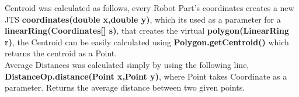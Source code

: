  Centroid was calculated as follows, every Robot Part's coordinates creates a new JTS \textbf{coordinates(double x,double y)}, which its used as a parameter for a \textbf{linearRing(Coordinates[] s)}, that creates the virtual \textbf{polygon(LinearRing r)}, the Centroid can be easily calculated using \textbf{Polygon.getCentroid()} which returns the centroid as a Point.\\
 
 Average Distances was calculated simply by using the following line, \textbf{DistanceOp.distance(Point x,Point y)}, where Point takes Coordinate as a parameter. Returns the average distance between two given points.
 \\
 
 
 